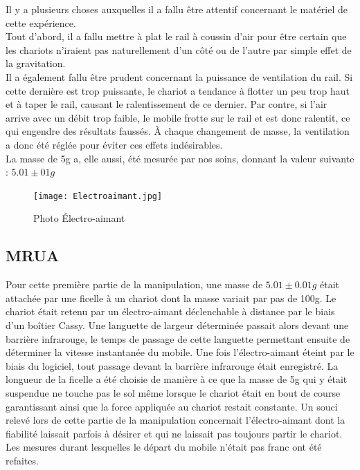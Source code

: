 Il y a plusieurs choses auxquelles il a fallu être attentif concernant le matériel de cette expérience.\\
Tout d'abord, il a fallu mettre à plat le rail à coussin d'air pour être certain que les chariots n'iraient pas naturellement d'un côté ou de l'autre par simple effet de la gravitation.\\
Il a également fallu être prudent concernant la puissance de ventilation du rail. Si cette dernière est trop puissante, le chariot a tendance à flotter un peu trop haut et à taper le rail, causant le ralentissement de ce dernier. Par contre, si l'air arrive avec un débit trop faible, le mobile frotte sur le rail et est donc ralentit, ce qui engendre des résultats faussés.
À chaque changement de masse, la ventilation a donc été réglée pour éviter ces effets indésirables.\\
La masse de 5g a, elle aussi, été mesurée par nos soins, donnant la valeur suivante : $5.01 \pm 01g$

\begin{figure}[h]
    \caption[Photo Électro-aimant]{Photo Électro-aimant}
    \centering
    \texttt{[image: Electroaimant.jpg]}
\end{figure}


\newpage
\subsection{MRUA}
Pour cette première partie de la manipulation, une masse de $5.01 \pm 0.01g$ était attachée par une ficelle à un chariot dont la masse variait par pas de 100g. Le chariot était retenu par un électro-aimant déclenchable à distance par le biais d'un boîtier Cassy. Une languette de largeur déterminée passait alors devant une barrière infrarouge, le temps de passage de cette languette permettant ensuite de déterminer la vitesse instantanée du mobile. Une fois l'électro-aimant éteint par le biais du logiciel, tout passage devant la barrière infrarouge était enregistré.
La longueur de la ficelle a été choisie de manière à ce que la masse de 5g qui y était suspendue ne touche pas le sol même lorsque le chariot était en bout de course garantissant ainsi que la force appliquée au chariot restait constante.
Un souci relevé lors de cette partie de la manipulation concernait l'électro-aimant dont la fiabilité laissait parfois à désirer et qui ne laissait pas toujours partir le chariot. Les mesures durant lesquelles le départ du mobile n'était pas franc ont été refaites.

